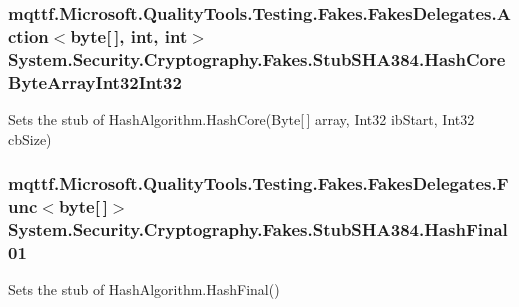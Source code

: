 \hypertarget{class_system_1_1_security_1_1_cryptography_1_1_fakes_1_1_stub_s_h_a384_ad527ec4fecbdfac8112e03071f8b5854}{
\subsubsection[{Hash\-Core\-Byte\-Array\-Int32\-Int32}]{\setlength{\rightskip}{0pt plus 5cm}mqttf.\-Microsoft.\-Quality\-Tools.\-Testing.\-Fakes.\-Fakes\-Delegates.\-Action$<$byte\mbox{[}$\,$\mbox{]}, int, int$>$ System.\-Security.\-Cryptography.\-Fakes.\-Stub\-S\-H\-A384.\-Hash\-Core\-Byte\-Array\-Int32\-Int32}}\label{class_system_1_1_security_1_1_cryptography_1_1_fakes_1_1_stub_s_h_a384_ad527ec4fecbdfac8112e03071f8b5854}


Sets the stub of Hash\-Algorithm.\-Hash\-Core(\-Byte\mbox{[}$\,$\mbox{]} array, Int32 ib\-Start, Int32 cb\-Size)

\hypertarget{class_system_1_1_security_1_1_cryptography_1_1_fakes_1_1_stub_s_h_a384_a6f6ee89d7ff5eb3aa28daad33cc9d631}{
\subsubsection[{Hash\-Final01}]{\setlength{\rightskip}{0pt plus 5cm}mqttf.\-Microsoft.\-Quality\-Tools.\-Testing.\-Fakes.\-Fakes\-Delegates.\-Func$<$byte\mbox{[}$\,$\mbox{]}$>$ System.\-Security.\-Cryptography.\-Fakes.\-Stub\-S\-H\-A384.\-Hash\-Final01}}\label{class_system_1_1_security_1_1_cryptography_1_1_fakes_1_1_stub_s_h_a384_a6f6ee89d7ff5eb3aa28daad33cc9d631}


Sets the stub of Hash\-Algorithm.\-Hash\-Final()

